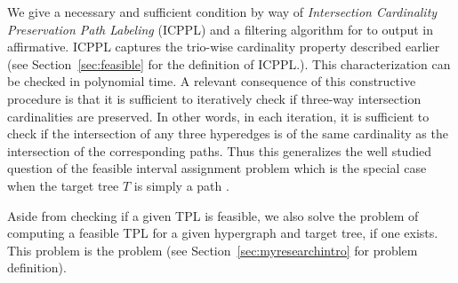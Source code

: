 We give a necessary and sufficient condition by way of {\em
  Intersection Cardinality Preservation Path Labeling} (ICPPL) and a
filtering algorithm for {\FTPL} to output in affirmative. ICPPL
captures the trio-wise cardinality property described
earlier (see Section~\ref{sec:feasible} for the definition of
  ICPPL.). This characterization can be checked in polynomial time.  A
relevant consequence of this constructive procedure is that it is
sufficient to iteratively check if three-way intersection
cardinalities are preserved.  In other words, in each iteration, it is
sufficient to check if the intersection of any three hyperedges is of
the same cardinality as the intersection of the corresponding paths.
Thus this generalizes the well studied question of the feasible
interval assignment problem which is the special case when the target
tree $T$ is simply a path \cite{wlh02,nsnrs09}.

Aside from checking if a given TPL is feasible, we also solve the
problem of computing a feasible TPL for a given hypergraph and target
tree, if one exists. This problem is the {\CFTPL} problem (see
Section~\ref{sec:myresearchintro} for problem definition). %



